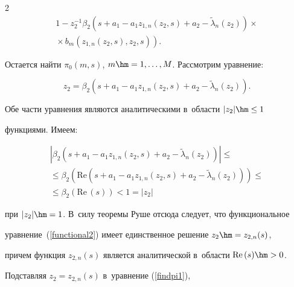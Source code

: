 \begin{multicols}{2}
\begin{multline*}
{1-z_2^{-1}\beta_2(s+a_1-a_1 z_{1,n}(z_2,s)+a_2-\widetilde{\lambda}_n(z_2))}\times{}\\


\left.{}\times b_m\left(z_{1,n}\left(z_2,s\right),z_2,s\right)\right).


\end{multline*}





Остается найти $\pi_0(m,s)$, $m\hm=1,\ldots,M$. Рас\-смот\-рим уравнение:


\begin{equation}


z_2=\beta_2\left(s+a_1-a_1 z_{1,n}\left(z_2,s\right)+


a_2-\widetilde{\lambda}_n\left(z_2\right)\!\right).\!\!


\label{functional2}


\end{equation}


Обе части уравнения являются аналитическими в~области $|z_2|\hm\leq 1$ 


функциями. Имеем:


\begin{multline*}


\left\vert\beta_2\left(s+a_1-a_1 z_{1,n}\left(z_2,s\right)+a_2-


\widetilde{\lambda}_n\left(z_2\right)\right)\right\vert


\leq{}\\


{}\leq\beta_2\left(\mathrm{Re}\left(s+a_1-a_1 z_{1,n}\left(z_2,s\right)+


a_2-\widetilde{\lambda}_n\left(z_2\right)\!\right)\!\right)\leq{}\\


{}\leq\beta_2(\mathrm{Re}\,(s))<1=\left|z_2\right|


\end{multline*}


при $|z_2|\hm=1$. В~силу теоремы Руше отсюда следует, что функциональное 


уравнение~(\ref{functional2}) имеет единственное решение $z_2\hm=z_{2,n}(s)$, 


причем функция $z_{2,n}(s)$ является аналитической в~области $\mathrm{Re}\,(s)\hm>0$.





Подставляя $z_2=z_{2,n}(s)$ в~уравнение (\ref{findpi1}), 



\end{multicols}
